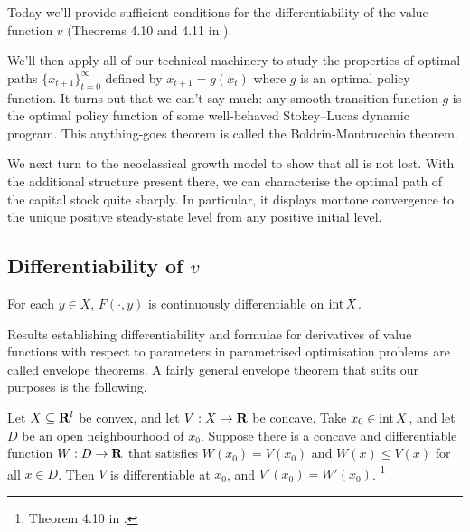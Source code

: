 \documentclass[11pt,letterpaper,reqno,oneside]{article}
\begin{document}
Today we'll provide sufficient conditions for the differentiability of the value function $v$ (Theorems 4.10 and 4.11 in \textcite{StokeyLucasPrescott1989}).

We'll then apply all of our technical machinery to study the properties of optimal paths $\{ x_{t+1} \}_{t=0}^\infty$ defined by $x_{t+1} = g(x_t)$ where $g$ is an optimal policy function. It turns out that we can't say much: any smooth transition function $g$ is the optimal policy function of some well-behaved Stokey--Lucas dynamic program. This anything-goes theorem is called the Boldrin-Montrucchio theorem.

We next turn to the neoclassical growth model to show that all is not lost. With the additional structure present there, we can characterise the optimal path of the capital stock quite sharply. In particular, it displays montone convergence to the unique positive steady-state level from any positive initial level.



\subsection{Differentiability of \texorpdfstring{$v$}{v}}
\label{sec:30Sep2015:differentiability_of_v}

\begin{assumption}
	For each $y \in X$, $F(\cdot,y)$ is continuously differentiable on $\operatorname*{int} X$.
\end{assumption}


Results establishing differentiability and formulae for derivatives of value functions with respect to parameters in parametrised optimisation problems are called envelope theorems. A fairly general envelope theorem that suits our purposes is the following.

\begin{theorem}
	Let $X \subseteq \mathbf{R}^l$ be convex, and let $V : X \to \mathbf{R}$ be concave. Take $x_0 \in \operatorname*{int} X$, and let $D$ be an open neighbourhood of $x_0$. Suppose there is a concave and differentiable function $W : D \to \mathbf{R}$ that satisfies $W(x_0) = V(x_0)$ and $W(x) \leq V(x)$ for all $x \in D$. Then $V$ is differentiable at $x_0$, and $V'(x_0) = W'(x_0)$.%
		\footnote{Theorem 4.10 in \textcite{StokeyLucasPrescott1989}.}
\end{theorem}
\end{document}
